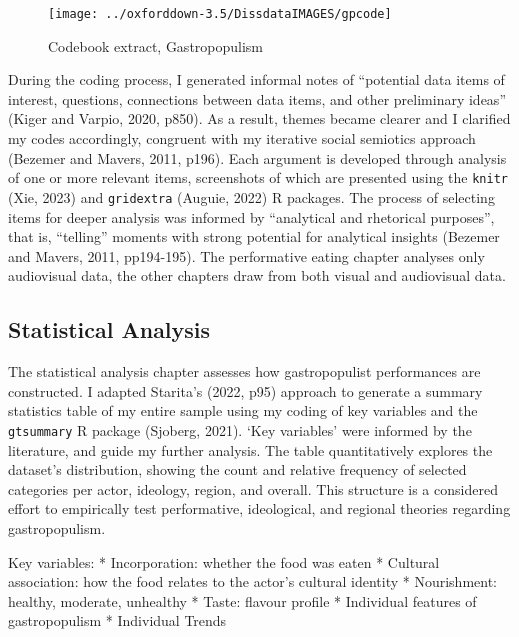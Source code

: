 \documentclass[a4paper, nobind]{templates/ociamthesis}
\begin{document}
\begin{figure}
\texttt{[image: ../oxforddown-3.5/DissdataIMAGES/gpcode]} \caption{Codebook extract, Gastropopulism}\label{fig:unnamed-chunk-3}
\end{figure}

During the coding process, I generated informal notes of ``potential data items of interest, questions, connections between data items, and other preliminary ideas'' (Kiger and Varpio, 2020, p850). As a result, themes became clearer and I clarified my codes accordingly, congruent with my iterative social semiotics approach (Bezemer and Mavers, 2011, p196). Each argument is developed through analysis of one or more relevant items, screenshots of which are presented using the \texttt{knitr} (Xie, 2023) and \texttt{gridextra} (Auguie, 2022) R packages. The process of selecting items for deeper analysis was informed by ``analytical and rhetorical purposes'', that is, ``telling'' moments with strong potential for analytical insights (Bezemer and Mavers, 2011, pp194-195). The performative eating chapter analyses only audiovisual data, the other chapters draw from both visual and audiovisual data.

\hypertarget{statistical-analysis}{%
\subsection*{Statistical Analysis}\label{statistical-analysis}}

The statistical analysis chapter assesses how gastropopulist performances are constructed. I adapted Starita's (2022, p95) approach to generate a summary statistics table of my entire sample using my coding of key variables and the \texttt{gtsummary} R package (Sjoberg, 2021). `Key variables' were informed by the literature, and guide my further analysis. The table quantitatively explores the dataset's distribution, showing the count and relative frequency of selected categories per actor, ideology, region, and overall. This structure is a considered effort to empirically test performative, ideological, and regional theories regarding gastropopulism.

Key variables:
* Incorporation: whether the food was eaten
* Cultural association: how the food relates to the actor's cultural identity
* Nourishment: healthy, moderate, unhealthy
* Taste: flavour profile
* Individual features of gastropopulism
* Individual Trends
\end{document}
